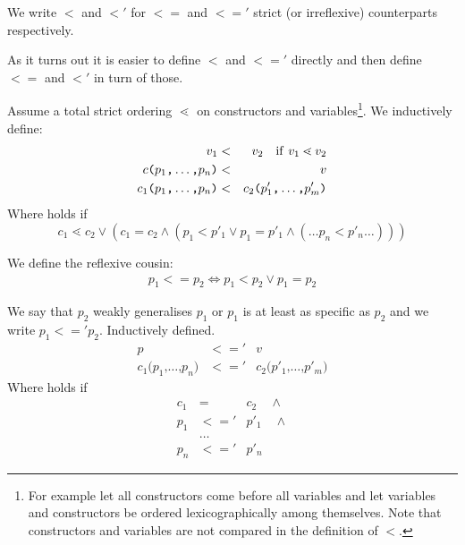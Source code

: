 We write $<$ and $<'$ for $<=$ and $<='$ strict (or irreflexive) counterparts
respectively.

As it turns out it is easier to define $<$ and $<='$ directly and then define
$<=$ and $<'$ in turn of those.

\begin{definition}\label{def:pat-total-order-strict}
  Assume a total strict ordering $\lessdot$ on constructors and
  variables\footnote{For example let all constructors come before all variables
    and let variables and constructors be ordered lexicographically among
    themselves. Note that constructors and variables are not compared in the
    definition of $<$.}. We inductively define:
  \begin{eqnarray}
    v_1 &<& v_2 \quad \mathrm{if}\ v_1 \lessdot v_2\label{eq:pat-total-order-strict-var}\\
    c\texttt{(}p_1\texttt{,} \ldots\texttt{,} p_n\texttt{)} &<& v\\
    c_1\texttt{(}p_1\texttt{,} \ldots\texttt{,} p_n\texttt{)} &<&
    c_2\texttt{(}p'_1\texttt{,} \ldots\texttt{,} p'_m\texttt{)}\label{eq:pat-total-order-strict-con}
  \end{eqnarray}
  Where  holds if
  \[
  c_1 \lessdot c_2 \lor (c_1 = c_2 \land ( p_1 < p'_1 \lor p_1 = p'_1 \land (\ldots p_n < p'_n \ldots )))
  \]
\end{definition}

\begin{definition}[Total ordering, $<=$]\label{def:pat-total-order-weak}
  We define the reflexive cousin:
  \begin{eqnarray*}
    p_1 <= p_2 \Longleftrightarrow p_1 < p_2 \lor p_1 = p_2
  \end{eqnarray*}
\end{definition}

\begin{definition}[Partial ordering, $<='$]\label{def:pat-partial-order-weak}
  We say that $p_2$ weakly generalises $p_1$ or $p_1$ is at least as specific as
  $p_2$ and we write $p_1 <=' p_2$. Inductively defined.
  \begin{eqnarray}
    p &<='& v \label{eq:pat-partial-order-weak-var}\\
    c_1\texttt{(}p_1\texttt{,} \ldots\texttt{,} p_n\texttt{)} &<='&
    c_2\texttt{(}p'_1\texttt{,} \ldots\texttt{,} p'_m\texttt{)}\label{eq:pat-partial-order-weak-con}
  \end{eqnarray}
  Where  holds if
  \begin{eqnarray*}
    c_1 &=& c_2 \quad \land\\
    p_1 &<='& p'_1 \quad \land\\
    &\ldots&\\
    p_n &<='& p'_n
  \end{eqnarray*}
\end{definition}


